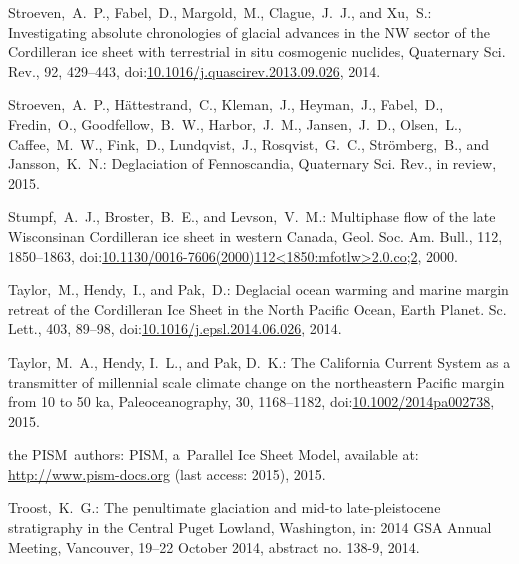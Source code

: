 \documentclass[tc, manuscript]{copernicus}
\begin{document}
\begin{thebibliography}{114}
Stroeven,~A.~P., Fabel,~D., Margold,~M., Clague,~J.~J., and Xu,~S.: Investigating absolute chronologies of glacial advances in the {NW} sector of the Cordilleran ice sheet with terrestrial in situ cosmogenic nuclides, Quaternary Sci. Rev., 92, 429--443,
doi:\href{http://dx.doi.org/10.1016/j.quascirev.2013.09.026}{10.1016/j.quascirev.2013.09.026}, 2014.


Stroeven,~A.~P., H{\"a}ttestrand,~C., Kleman,~J., Heyman,~J., Fabel,~D.,
Fredin,~O., Goodfellow,~B.~W., Harbor,~J.~M., Jansen,~J.~D., Olsen,~L.,
Caffee,~M.~W., Fink,~D., Lundqvist,~J., Rosqvist,~G.~C., Str\"omberg,~B., and
Jansson,~K.~N.: Deglaciation of Fennoscandia, Quaternary Sci. Rev., in
review, 2015.


Stumpf,~A.~J., Broster,~B.~E., and Levson,~V.~M.: Multiphase flow of the late Wisconsinan Cordilleran ice sheet in western Canada, Geol. Soc. Am. Bull., 112, 1850--1863,
doi:\href{http://dx.doi.org/10.1130/0016-7606(2000)112<1850:mfotlw>2.0.co;2}{10.1130/0016-7606(2000)112\textless1850:mfotlw\textgreater2.0.co;2}, 2000.


Taylor,~M., Hendy,~I., and Pak,~D.: Deglacial ocean warming and marine margin retreat of the Cordilleran Ice Sheet in the North Pacific Ocean, Earth Planet. Sc. Lett., 403, 89--98,
doi:\href{http://dx.doi.org/10.1016/j.epsl.2014.06.026}{10.1016/j.epsl.2014.06.026}, 2014.


Taylor, M.~A., Hendy, I.~L., and Pak, D.~K.: The California Current System as a transmitter of millennial scale climate change on the northeastern Pacific margin from 10 to 50 ka, Paleoceanography, 30, 1168--1182,
doi:\href{http://dx.doi.org/10.1002/2014pa002738}{10.1002/2014pa002738}, 2015.


the PISM~authors: {PISM}, a~{P}arallel {I}ce {S}heet {M}odel, available at:
\url{http://www.pism-docs.org} (last access: 2015), 2015.


Troost,~K.~G.: The penultimate glaciation and mid-to late-pleistocene
stratigraphy in the Central Puget Lowland, Washington, in: 2014 GSA Annual
Meeting, Vancouver, 19--22 October 2014, abstract no. 138-9, 2014.



\end{thebibliography}
\end{document}
